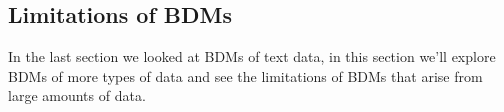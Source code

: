 \documentclass[12pt,a4paper]{article}
\begin{document}
\pagebreak
\begin{samepage}
\subsection{Limitations of BDMs}
In the last section we looked at BDMs of text data, in this section we'll explore BDMs of more types of data and see the limitations of BDMs that arise from large amounts of data. 
\begin{figure}[!h]
    \centering
\end{figure}
\end{samepage}
\end{document}
